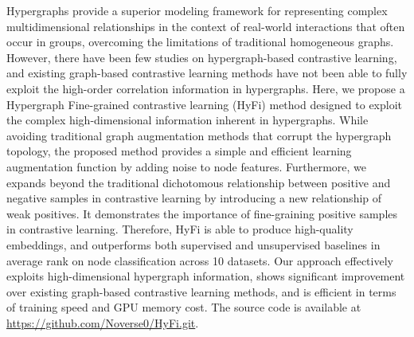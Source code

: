Hypergraphs provide a superior modeling framework for representing complex multidimensional relationships in the context of real-world interactions that often occur in groups, overcoming the limitations of traditional homogeneous graphs. However, there have been few studies on hypergraph-based contrastive learning, and existing graph-based contrastive learning methods have not been able to fully exploit the high-order correlation information in hypergraphs. Here, we propose a Hypergraph Fine-grained contrastive learning (HyFi) method designed to exploit the complex high-dimensional information inherent in hypergraphs. While avoiding traditional graph augmentation methods that corrupt the hypergraph topology, the proposed method provides a simple and efficient learning augmentation function by adding noise to node features. Furthermore, we expands beyond the traditional dichotomous relationship between positive and negative samples in contrastive learning by introducing a new relationship of weak positives. It demonstrates the importance of fine-graining positive samples in contrastive learning. Therefore, HyFi is able to produce high-quality embeddings, and outperforms both supervised and unsupervised baselines in average rank on node classification across 10 datasets. Our approach effectively exploits high-dimensional hypergraph information, shows significant improvement over existing graph-based contrastive learning methods, and is efficient in terms of training speed and GPU memory cost. The source code is available at \url{https://github.com/Noverse0/HyFi.git}.


